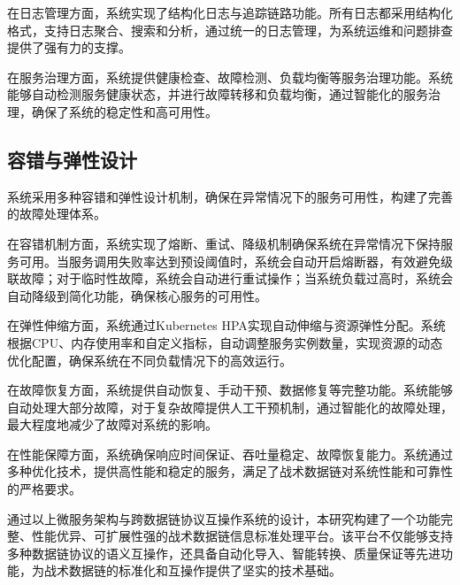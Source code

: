 在日志管理方面，系统实现了结构化日志与追踪链路功能。所有日志都采用结构化格式，支持日志聚合、搜索和分析，通过统一的日志管理，为系统运维和问题排查提供了强有力的支撑。

在服务治理方面，系统提供健康检查、故障检测、负载均衡等服务治理功能。系统能够自动检测服务健康状态，并进行故障转移和负载均衡，通过智能化的服务治理，确保了系统的稳定性和高可用性。

\subsection{容错与弹性设计}

系统采用多种容错和弹性设计机制，确保在异常情况下的服务可用性，构建了完善的故障处理体系。

在容错机制方面，系统实现了熔断、重试、降级机制确保系统在异常情况下保持服务可用。当服务调用失败率达到预设阈值时，系统会自动开启熔断器，有效避免级联故障；对于临时性故障，系统会自动进行重试操作；当系统负载过高时，系统会自动降级到简化功能，确保核心服务的可用性。

在弹性伸缩方面，系统通过Kubernetes HPA实现自动伸缩与资源弹性分配。系统根据CPU、内存使用率和自定义指标，自动调整服务实例数量，实现资源的动态优化配置，确保系统在不同负载情况下的高效运行。

在故障恢复方面，系统提供自动恢复、手动干预、数据修复等完整功能。系统能够自动处理大部分故障，对于复杂故障提供人工干预机制，通过智能化的故障处理，最大程度地减少了故障对系统的影响。

在性能保障方面，系统确保响应时间保证、吞吐量稳定、故障恢复能力。系统通过多种优化技术，提供高性能和稳定的服务，满足了战术数据链对系统性能和可靠性的严格要求。

通过以上微服务架构与跨数据链协议互操作系统的设计，本研究构建了一个功能完整、性能优异、可扩展性强的战术数据链信息标准处理平台。该平台不仅能够支持多种数据链协议的语义互操作，还具备自动化导入、智能转换、质量保证等先进功能，为战术数据链的标准化和互操作提供了坚实的技术基础。